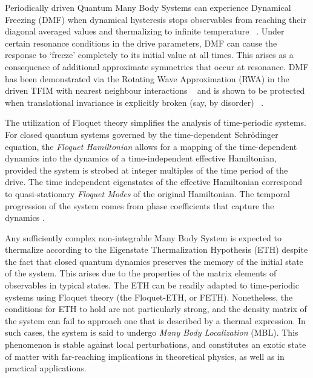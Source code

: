 \documentclass[%
reprint,
superscriptaddress,
amsmath,amssymb,
aps,
prb,
showkeys,
]{revtex4-2}
\begin{document}
	\maketitle
	
	
	Periodically driven Quantum Many Body Systems can experience Dynamical Freezing (DMF) when  dynamical hysteresis stops observables from reaching their diagonal averaged values and thermalizing to infinite temperature ~\cite{bordia_periodically_2017, sahoo_periodically_2019, das_exotic_2010}. Under certain resonance conditions in the drive parameters, DMF can cause the response to ‘freeze’ completely to its initial value at all times. This arises as a consequence of additional approximate symmetries that occur at resonance. DMF has been demonstrated via the Rotating Wave Approximation (RWA) in the driven TFIM with nearest neighbour interactions ~\cite{mbeng_quantum_2020} and is shown to be protected when translational invariance is explicitly broken (say, by disorder) ~\cite{yamada_localization_2022, roy_fate_2015}. 

	The utilization of Floquet theory simplifies the analysis of time-periodic systems. For closed quantum systems governed by the time-dependent Schr\"odinger equation, the \textit{Floquet Hamiltonian} allows for a mapping 
of the time-dependent dynamics into the dynamics of 	
a time-independent effective Hamiltonian, provided the system is strobed at integer multiples of the time period of the drive. The time independent eigenstates of the effective Hamiltonian correspond to quasi-stationary \textit{Floquet Modes} of the original Hamiltonian. The temporal progression of the system comes from  phase coefficients that capture the dynamics \cite{li_floquet_2018,eckardt_high_frequency_2015}.	
	
	Any sufficiently complex non-integrable Many Body System is expected to thermalize according to the Eigenstate Thermalization Hypothesis (ETH) despite the fact that closed quantum dynamics preserves the memory of the initial state of the system. This arises due to the properties of the matrix elements of observables 
	in typical states\cite{zhang_floquet_2016}. The ETH can be readily adapted to time-periodic systems using Floquet theory (the Floquet-ETH, or FETH). Nonetheless, the conditions for ETH to hold are not particularly strong, and the density matrix of the system can fail to approach one that is described by a thermal expression. In such cases, the system is said to undergo \textit{Many Body Localization} (MBL)\cite{khemani_phase_2016}. This phenomenon is stable against local perturbations, and constitutes an exotic state of matter with far-reaching implications in theoretical physics, as well as in practical applications\cite{yunger_halpern_quantum_2019}.
	
\end{document}
